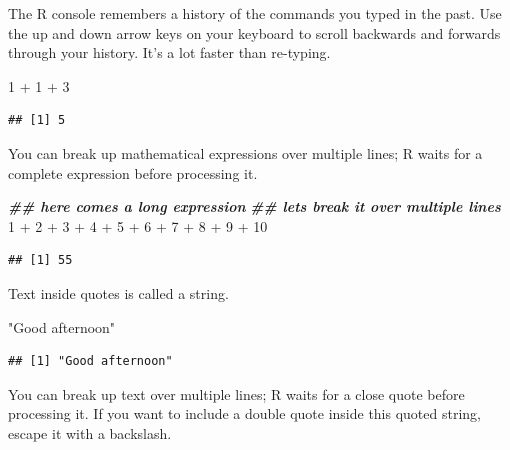 \documentclass[
  oneside]{book}
\newenvironment{Shaded}{\begin{snugshade}}{\end{snugshade}}
\newcommand{\DecValTok}[1]{\textcolor[rgb]{0.00,0.00,0.81}{#1}}
\newcommand{\DocumentationTok}[1]{\textcolor[rgb]{0.56,0.35,0.01}{\textbf{\textit{#1}}}}
\newcommand{\SpecialCharTok}[1]{\textcolor[rgb]{0.00,0.00,0.00}{#1}}
\newcommand{\StringTok}[1]{\textcolor[rgb]{0.31,0.60,0.02}{#1}}
\begin{document}
The R console remembers a history of the commands you typed in the past. Use the up and down arrow keys on your keyboard to scroll backwards and forwards through your history. It's a lot faster than re-typing.

\begin{Shaded}
\begin{Highlighting}[]
\DecValTok{1} \SpecialCharTok{+} \DecValTok{1} \SpecialCharTok{+} \DecValTok{3}
\end{Highlighting}
\end{Shaded}

\begin{verbatim}
## [1] 5
\end{verbatim}

You can break up mathematical expressions over multiple lines; R waits for a complete expression before processing it.

\begin{Shaded}
\begin{Highlighting}[]
\DocumentationTok{\#\# here comes a long expression}
\DocumentationTok{\#\# let\textquotesingle{}s break it over multiple lines}
\DecValTok{1} \SpecialCharTok{+} \DecValTok{2} \SpecialCharTok{+} \DecValTok{3} \SpecialCharTok{+} \DecValTok{4} \SpecialCharTok{+} \DecValTok{5} \SpecialCharTok{+} \DecValTok{6} \SpecialCharTok{+}
    \DecValTok{7} \SpecialCharTok{+} \DecValTok{8} \SpecialCharTok{+} \DecValTok{9} \SpecialCharTok{+}
    \DecValTok{10}
\end{Highlighting}
\end{Shaded}

\begin{verbatim}
## [1] 55
\end{verbatim}

Text inside quotes is called a string.

\begin{Shaded}
\begin{Highlighting}[]
\StringTok{"Good afternoon"}
\end{Highlighting}
\end{Shaded}

\begin{verbatim}
## [1] "Good afternoon"
\end{verbatim}

You can break up text over multiple lines; R waits for a close quote before processing it. If you want to include a double quote inside this quoted string, escape it with a backslash.
\end{document}
